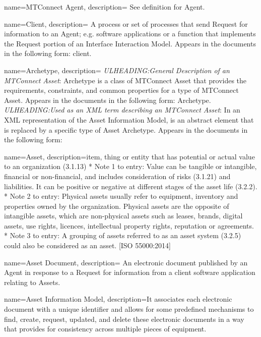 {
    name={MTConnect Agent},
	description={
	See definition for \gls{Agent}.
}
}

{
    name={Client},
	description={
  A process or set of processes that send \gls{Request} for information to an \gls{Agent}; e.g. software applications or a function that implements the \gls{Request} portion of an \gls{Interface} \gls{Interaction Model}.
  Appears in the documents in the following form: client.
}
}

{
    name={Archetype},
	description={
  \textit{ULHEADING:General Description of an \gls{MTConnect Asset}}:
  Archetype is a class of \gls{MTConnect Asset} that provides the requirements, constraints, and common properties for a type of \gls{MTConnect Asset}.
  Appears in the documents in the following form: Archetype.
  \textit{ULHEADING:Used as an XML term describing an \gls{MTConnect Asset}}:
  In an XML representation of the \gls{Asset Information Model},  is an abstract element that is replaced by a specific type of \gls{Asset} Archetype.
  Appears in the documents in the following form: 
}
}

{
    name={Asset},
	description={item, thing or entity that has potential or actual value to an organization (3.1.13)
* Note 1 to entry: Value can be tangible or intangible, financial or non-financial, and includes consideration of risks (3.1.21) and liabilities. It can be positive or negative at different stages of the asset life (3.2.2).
* Note 2 to entry: Physical assets usually refer to equipment, inventory and properties owned by the organization. Physical assets are the opposite of intangible assets, which are non-physical assets such as leases, brands, digital assets, use rights, licences, intellectual property rights, reputation or agreements.
* Note 3 to entry: A grouping of assets referred to as an asset system (3.2.5) could also be considered as an asset.
[ISO 55000:2014]}
}

{
    name={Asset Document},
	description={
	An electronic document published by an \gls{Agent} in response to a \gls{Request} for information from a client software application relating to Assets.
}
}

{
    name={Asset Information Model},
	description={It associates each electronic  document with a unique identifier and allows for some predefined mechanisms to find, create, request, updated, and delete these electronic documents in a way that provides for consistency across multiple pieces of equipment.}
}

